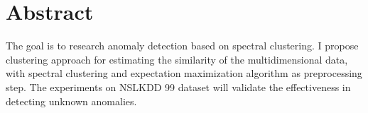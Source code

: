 \chapter{Abstract}

The goal is to research anomaly detection based on spectral clustering. I propose clustering approach for estimating the similarity of the multi­dimensional data, with spectral clustering and expectation maximization algorithm as pre­processing step. The experiments on NSL­KDD 99 dataset will validate the effectiveness in detecting unknown anomalies.
